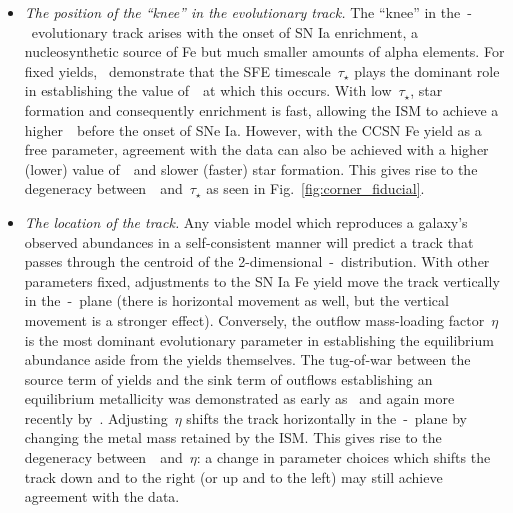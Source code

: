 \documentclass[ms.tex]{subfiles}
\begin{document}
\begin{itemize}
\begin{itemize}
		\item \textit{The position of the ``knee'' in the evolutionary track.}
		The ``knee'' in the~\afe-\feh~evolutionary track arises with the onset
		of SN Ia enrichment, a nucleosynthetic source of Fe but much smaller
		amounts of alpha elements.
		For fixed yields,~\citet{Weinberg2017} demonstrate that the SFE
		timescale~$\tau_\star$ plays the dominant role in establishing the
		value of~\feh~at which this occurs.
		With low~$\tau_\star$, star formation and consequently enrichment is
		fast, allowing the ISM to achieve a higher~\feh~before the onset of
		SNe Ia.
		However, with the CCSN Fe yield as a free parameter, agreement with the
		data can also be achieved with a higher (lower) value of~\yfecc~and
		slower (faster) star formation.
		This gives rise to the degeneracy between~\yfecc~and~$\tau_\star$ as
		seen in Fig.~\ref{fig:corner_fiducial}.

		\item \textit{The location of the track.}
		Any viable model which reproduces a galaxy's observed abundances in a
		self-consistent manner will predict a track that passes through the
		centroid of the 2-dimensional~\afe-\feh~distribution.
		With other parameters fixed, adjustments to the SN Ia Fe yield move the
		track vertically in the~\afe-\feh~plane (there is horizontal movement
		as well, but the vertical movement is a stronger effect).
		Conversely, the outflow mass-loading factor~$\eta$ is the most dominant
		evolutionary parameter in establishing the equilibrium abundance aside
		from the yields themselves.
		The tug-of-war between the source term of yields and the sink term of
		outflows establishing an equilibrium metallicity was demonstrated as
		early as~\citet{Larson1974} and again more recently
		by~\citet{Weinberg2017}.
		Adjusting~$\eta$ shifts the track horizontally in the~\afe-\feh~plane
		by changing the metal mass retained by the ISM.
		This gives rise to the degeneracy between~\yfeia~and~$\eta$: a change
		in parameter choices which shifts the track down and to the right (or
		up and to the left) may still achieve agreement with the data.


\end{itemize}
\end{itemize}
\end{document}
